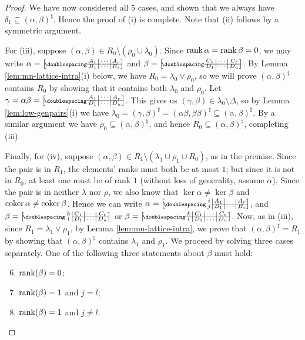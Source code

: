\begin{lemma}
\begin{proof}
    We have now considered all 5 cases, and shown that we always have
    $\delta_1 \subseteq (\alpha, \beta)^\sharp$.  Hence the proof of
    (i) is complete.  Note that (ii) follows by a symmetric argument.

    For (iii), suppose $(\alpha,\beta)\in R_0\setminus(\rho_0\cup\lambda_0)$.
    Since $\operatorname{rank}\alpha = \operatorname{rank}\beta = 0$, we may write
    $\alpha=\bipart{c|c|c}{1-3}{A_1 & \cdots & A_r}{B_1 & \cdots & B_s}$ and
    $\beta=\bipart{c|c|c}{1-3}{C_1 & \cdots & C_t}{D_1 & \cdots & D_u}$.
    By Lemma \ref{lem:mn-lattice-intra}(i) below, we have
    $R_0 = \lambda_0\vee\rho_0$, so we will prove $(\alpha,\beta)^\sharp$
    contains $R_0$ by showing that it contains both $\lambda_0$ and $\rho_0$.
    Let $\gamma = \alpha\beta =
    \bipart{c|c|c}{1-3}{A_1 & \cdots & A_r}{D_1 & \cdots & D_u}$.
    This gives us
    $(\gamma,\beta) \in \lambda_0\setminus\Delta$,
    so by Lemma \ref{lem:low-genpairs}(i) we have
    $\lambda_0 = (\gamma,\beta)^\sharp
    = (\alpha\beta, \beta\beta)^\sharp
    \subseteq (\alpha, \beta)^\sharp$.  By a similar argument we have
    $\rho_0 \subseteq (\alpha,\beta)^\sharp$, and hence
    $R_0 \subseteq (\alpha,\beta)^\sharp$, completing (iii).

    Finally, for (iv), suppose
    $(\alpha,\beta) \in R_1 \setminus (\lambda_1 \cup \rho_1 \cup R_0)$, as in
    the premise.  Since the pair is in $R_1$, the elements' ranks must both be
    at most $1$; but since it is not in $R_0$, at least one must be of rank $1$
    (without loss of generality, assume $\alpha$).  Since the pair is in neither
    $\lambda$ nor $\rho$, we also know that $\ker\alpha \neq \ker\beta$ and
    $\operatorname{coker}\alpha \neq \operatorname{coker}\beta$.
    Hence we can write
    $\alpha = \bipart{c|c|c|c}{2-4}
    {i & A_1 & \cdots & A_r}{j & B_1 & \cdots & B_s}$, and
    $\beta = \bipart{c|c|c|c}{2-4}
    {k & C_1 & \cdots & C_t}{l & D_1 & \cdots & D_u}$ or
    $\beta = \bipart{c|c|c|c}{1-4}
    {k & C_1 & \cdots & C_t}{l & D_1 & \cdots & D_u}$.  Now, as in (iii),
    since $R_1 = \lambda_1 \vee \rho_1$, by Lemma \ref{lem:mn-lattice-intra}, we
    prove that $(\alpha,\beta)^\sharp = R_1$ by showing that
    $(\alpha,\beta)^\sharp$ contains $\lambda_1$ and $\rho_1$.  We proceed by
    solving three cases separately.  One of the following three statements about
    $\beta$ must hold:
    \begin{enumerate}[\rm(a)]
      \setcounter{enumi}{5}
    \item $\operatorname{rank}(\beta) = 0$;
    \item $\operatorname{rank}(\beta) = 1$ and $j = l$;
    \item $\operatorname{rank}(\beta) = 1$ and $j \neq l$.
    \end{enumerate}


\end{proof}
\end{lemma}
